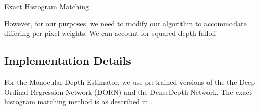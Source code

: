 \begin{algorithm}[H]
 \caption{Exact Histogram Matching} 
 \label{alg:ehm}
 
\end{algorithm}


However, for our purposes, we need to modify our algorithm to accommodate
differing per-pixel weights. We can account for squared depth falloff

\subsection{Implementation Details}
For the Monocular Depth Estimator, we use pretrained versions of the
the Deep Ordinal Regression Network (DORN) \cite{} and the DenseDepth Network.
The exact histogram matching method is as described in \cite{}.


